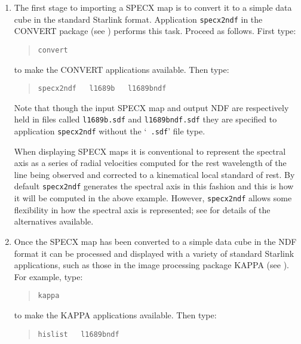 \begin{enumerate}

  \item The first stage to importing a SPECX map is to convert it to a
   simple data cube in the standard Starlink 
   format.  Application {\tt specx2ndf} in the CONVERT package
   (see \cite{SUN55}) performs this task.
   Proceed as follows.  First type:

  \begin{quote}
   {\tt convert}
  \end{quote}

   to make the CONVERT applications available.  Then type:

  \begin{quote}
   {\tt specx2ndf ~ l1689b ~ l1689bndf}
  \end{quote}

   Note that though the input SPECX map and output NDF are respectively
   held in files called {\tt l1689b.sdf} and {\tt l1689bndf.sdf}
   they are specified to application {\tt specx2ndf} without the `{\tt
   .sdf}' file type.

   When displaying SPECX maps it is conventional to represent the
   spectral axis as a series of radial velocities computed for the
   rest wavelength of the line being observed and corrected to a
   kinematical local standard of rest.  By default {\tt specx2ndf}
   generates the spectral axis in this fashion and this is how it will
   be computed in the above example.  However, {\tt specx2ndf} allows
   some flexibility in how the spectral axis is represented; see
    for
   details of the alternatives available.

  \item Once the SPECX map has been converted to a simple data cube in
   the NDF format it can be processed and displayed with a variety
   of standard Starlink applications, such as those in the image
   processing package KAPPA (see \cite{SUN95}).
   For example, type:

  \begin{quote}
   {\tt kappa}
  \end{quote}

   to make the KAPPA applications available.  Then type:

  \begin{quote}
   {\tt hislist ~ l1689bndf}
  \end{quote}


\end{enumerate}
